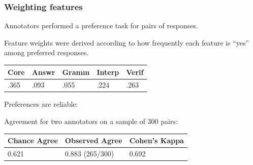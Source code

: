 \documentclass[xcolor={dvipsnames}]{beamer}
\begin{document}
\begin{frame}
\frametitle{Weighting features}

\vspace{1em}

Annotators performed a preference task for pairs of responses. \\

\vspace{.7em}

\pause
Feature weights were derived according to how frequently each feature is ``yes'' among preferred responses. \\

\vspace{1em}
\pause
\begin{table}[htb!]
\begin{center}
\begin{tabular}{|l|l|l|l|l|}
\hline
Core & Answr & Gramm & Interp & Verif \\
\hline
.365 & .093 & .055 & .224 & .263 \\
\hline
\end{tabular}
\end{center}
\end{table}

\vspace{1em}

\pause

Preferences are reliable:

\vspace{1em}

Agreement for two annotators on a sample of 300 pairs:

\vspace{1em}

\begin{table}[htb!]
\begin{center}
\begin{tabular}{|l|l|l|}
\hline
 Chance Agree & Observed Agree & Cohen's Kappa \\
\hline
0.621 & 0.883 (265/300) & 0.692 \\
\hline
\end{tabular}
\end{center}
\end{table}

\end{frame}
\end{document}

